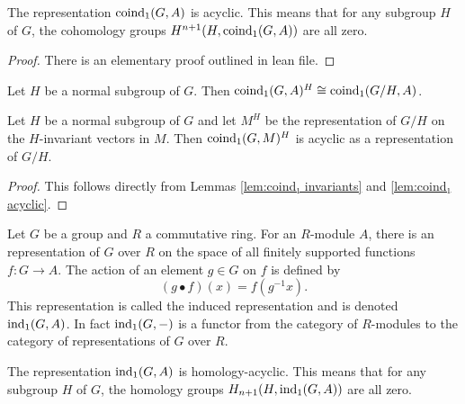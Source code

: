 \begin{lemma}
	\label{lem:coind₁ acyclic}
	\leanok
	The representation $\mathrm{coind}_1(G,A)$ is acyclic. This means that
	for any subgroup $H$ of $G$, the cohomology groups $H^{n+1}(H,\mathrm{coind}_1(G,A))$ are
	all zero.
\end{lemma}

\begin{proof}
	There is an elementary proof outlined in lean file.
\end{proof}

\begin{lemma}
	\label{lem:coind₁ invariants}
	\leanok
	Let $H$ be a normal subgroup of $G$. Then $\mathrm{coind}_1(G,A)^H \cong \mathrm{coind}_1(G/H,A)$.
\end{lemma}

\begin{corollary}
	\label{cor:coind₁ invariants acyclic}
	\leanok
	Let $H$ be a normal subgroup of $G$ and let $M^H$ be the representation of $G/H$ on the
	$H$-invariant vectors in $M$. Then $\mathrm{coind}_1(G,M)^H$ is acyclic as a representation of $G/H$.
\end{corollary}

\begin{proof}
	\leanok
	This follows directly from Lemmas \ref{lem:coind₁ invariants} and \ref{lem:coind₁ acyclic}.
\end{proof}

\begin{definition}
	\label{def:ind₁}
	\leanok
	Let $G$ be a group and $R$ a commutative ring.
	For an $R$-module $A$, there is an representation of $G$ over $R$
	on the space of all finitely supported functions $f : G \to A$.
	The action of an element $g \in G$ on $f$ is defined by
	\[
		(g \bullet f) (x) = f(g^{-1}x).
	\]
	This representation is called the induced representation and is denoted $\mathrm{ind}_1(G,A)$.
	In fact $\mathrm{ind}_1(G,-)$ is a functor from the category of $R$-modules to the category of
	representations	of $G$ over $R$.
\end{definition}

\begin{lemma}
	\label{lem:ind₁ homology-acyclic}
	\leanok
	The representation $\mathrm{ind}_1(G,A)$ is homology-acyclic. This means that
	for any subgroup $H$ of $G$, the homology groups $H_{n+1}(H,\mathrm{ind}_1(G,A))$ are
	all zero.
\end{lemma}

